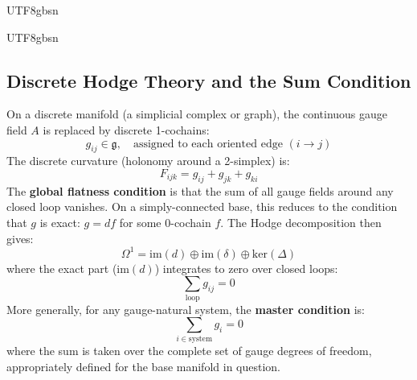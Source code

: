 \documentclass[11pt,a4paper]{article}
\begin{document}
\begin{CJK}{UTF8}{gbsn}
{\begin{CJK}{UTF8}{gbsn}
\subsection{Discrete Hodge Theory and the Sum Condition}
On a discrete manifold (a simplicial complex or graph), the continuous gauge field
$A$ is replaced by discrete 1-cochains:
\begin{equation}
    g_{ij} \in \mathfrak{g}, \quad \text{assigned to each oriented edge } (i \to j)
\end{equation}
The discrete curvature (holonomy around a 2-simplex) is:
\begin{equation}
    F_{ijk} = g_{ij} + g_{jk} + g_{ki}
\end{equation}
The \textbf{global flatness condition} is that the sum of all gauge fields around any
closed loop vanishes. On a simply-connected base, this reduces to the condition that
$g$ is exact: $g = df$ for some 0-cochain $f$. The Hodge decomposition then gives:
\begin{equation}
    \Omega^1 = \mathrm{im}(d) \oplus \mathrm{im}(\delta) \oplus \mathrm{ker}(\Delta)
\end{equation}
where the exact part ($\mathrm{im}(d)$) integrates to zero over closed loops:
\begin{equation}
    \sum_{\text{loop}} g_{ij} = 0
\end{equation}
More generally, for any gauge-natural system, the \textbf{master condition} is:
\begin{equation}
    \boxed{\sum_{i \in \text{system}} g_i = 0}
\end{equation}
where the sum is taken over the complete set of gauge degrees of freedom, appropriately
defined for the base manifold in question.

\end{CJK}}
\end{CJK}
\end{document}
